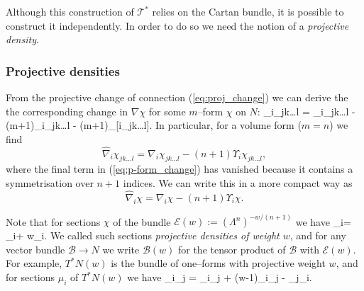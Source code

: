 Although this construction of $\mathcal{T}^*$ relies on the Cartan bundle, it is possible to construct it independently. In order to do so we need the notion of a \textit{projective density}.%
\subsubsection{Projective densities}
From the projective change of connection (\ref{eq:proj_change}) we can derive the the corresponding change in $\nabla\chi$ for some $m$--form $\chi$ on $N$:
\be \label{eq:p-form_change}
\widehat{\nabla}_i\chi_{jk\dots l} = \nabla_i\chi_{jk\dots l} - (m+1)\Upsilon_i\chi_{jk\dots l} - (m+1)\Upsilon_{[i}\chi_{jk\dots l]}.
\ee
In particular, for a volume form ($m=n$) we find
\[
\widehat{\nabla}_i\chi_{jk\dots l} = \nabla_i\chi_{jk\dots l} - (n+1)\Upsilon_i\chi_{jk\dots l},
\]
where the final term in (\ref{eq:p-form_change}) has vanished because it contains a symmetrisation over $n+1$ indices. We can write this in a more compact way as
\[
\widehat{\nabla}_i\chi = \nabla_i\chi - (n+1)\Upsilon_i\chi.
\]

Note that for sections $\chi$ of the bundle $\mathcal{E}(w):=(\Lambda^n)^{-w/(n+1)}$ we have
\be \label{eq:ddensity_change}
\widehat{\nabla}_i\chi = \nabla_i\chi + w\Upsilon_i\chi.
\ee
We called such sections \textit{projective densities of weight $w$}, and for any vector bundle $\mathcal{B}\rightarrow N$ we write $\mathcal{B}(w)$ for the tensor product of $\mathcal{B}$ with $\mathcal{E}(w)$. For example, $T^*N(w)$ is the bundle of one--forms with projective weight $w$, and for sections $\mu_i$ of $T^*N(w)$ we have
\be \label{eq:dweighted_form_change}
\widehat{\nabla}_i\mu_j = \nabla_i\mu_j + (w-1)\Upsilon_i\mu_j - \Upsilon_j\mu_i.
\ee


